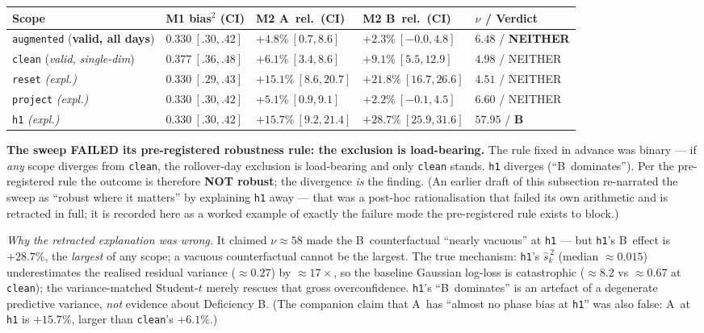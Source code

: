 \documentclass[11pt]{article}
\newcommand{\defA}{\textsf{A}}
\newcommand{\defB}{\textsf{B}}
\begin{document}
\begin{center}
\begin{tabular}{@{}lllll@{}}
\toprule
\textbf{Scope} & \textbf{M1 bias$^2$ (CI)}
 & \textbf{M2 \defA\ rel.\ (CI)} & \textbf{M2 \defB\ rel.\ (CI)}
 & $\nu$ / \textbf{Verdict} \\
\midrule
\texttt{augmented} (\textbf{valid, all days})
 & $0.330\ [.30,.42]$ & $+4.8\%\ [0.7,8.6]$
 & $+2.3\%\ [-0.0,4.8]$ & $6.48$ / \textbf{NEITHER} \\
\texttt{clean} (\emph{valid, single-dim})
 & $0.377\ [.36,.48]$ & $+6.1\%\ [3.4,8.6]$
 & $+9.1\%\ [5.5,12.9]$ & $4.98$ / NEITHER \\
\texttt{reset} \emph{(expl.)}
 & $0.330\ [.29,.43]$ & $+15.1\%\ [8.6,20.7]$
 & $+21.8\%\ [16.7,26.6]$ & $4.51$ / NEITHER \\
\texttt{project} \emph{(expl.)}
 & $0.330\ [.30,.42]$ & $+5.1\%\ [0.9,9.1]$
 & $+2.2\%\ [-0.1,4.5]$ & $6.60$ / NEITHER \\
\texttt{h1} \emph{(expl.)}
 & $0.330\ [.30,.42]$ & $+15.7\%\ [9.2,21.4]$
 & $+28.7\%\ [25.9,31.6]$ & $57.95$ / \textbf{B} \\
\bottomrule
\end{tabular}
\end{center}

\noindent\textbf{The sweep FAILED its pre-registered robustness rule:
the exclusion is load-bearing.} The rule fixed in advance was binary
--- if \emph{any} scope diverges from \texttt{clean}, the
rollover-day exclusion is load-bearing and only \texttt{clean} stands.
\texttt{h1} diverges (``\defB\ dominates''). Per the pre-registered
rule the outcome is therefore \textbf{NOT robust}; the divergence
\emph{is} the finding. (An earlier draft of this subsection re-narrated
the sweep as ``robust where it matters'' by explaining \texttt{h1}
away --- that was a post-hoc rationalisation that failed its own
arithmetic and is retracted in full; it is recorded here as a worked
example of exactly the failure mode the pre-registered rule exists to
block.)

\emph{Why the retracted explanation was wrong.} It claimed
$\nu\approx58$ made the \defB\ counterfactual ``nearly vacuous'' at
\texttt{h1} --- but \texttt{h1}'s \defB\ effect is $+28.7\%$, the
\emph{largest} of any scope; a vacuous counterfactual cannot be the
largest. The true mechanism: \texttt{h1}'s $\widehat{s}^{\,2}_k$
(median ${\approx}0.015$) underestimates the realised residual
variance (${\approx}0.27$) by ${\approx}17\times$, so the baseline
Gaussian log-loss is catastrophic (${\approx}8.2$ vs ${\approx}0.67$
at \texttt{clean}); the variance-matched Student-$t$ merely rescues
that gross overconfidence. \texttt{h1}'s ``\defB\ dominates'' is an
artefact of a degenerate predictive variance, \emph{not} evidence
about Deficiency \defB. (The companion claim that \defA\ has ``almost
no phase bias at \texttt{h1}'' was also false: \defA\ at \texttt{h1} is
$+15.7\%$, larger than \texttt{clean}'s $+6.1\%$.)
\end{document}
